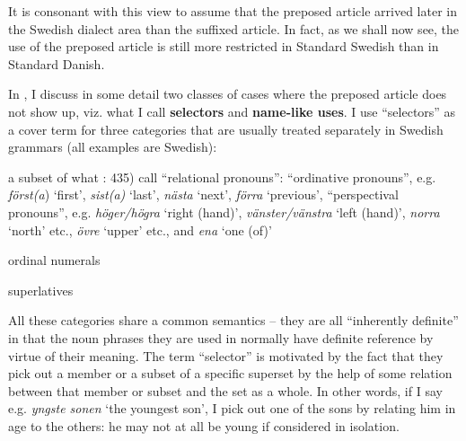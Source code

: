 \begin{styleBodytextC}
It is consonant with this view to assume that the preposed article arrived later in the Swedish dialect area than the suffixed article. In fact, as we shall now see, the use of the preposed article is still more restricted in Standard Swedish than in Standard Danish. 

\end{styleBodytextC}

\begin{styleBodytextC}
In \citet{Dahl2003}, I discuss in some detail two classes of cases where the preposed article does not show up, viz. what I call \textbf{selectors} and \textbf{name-like uses}. I use “selectors” as a cover term for three categories that are usually treated separately in Swedish grammars (all examples are Swedish):

\end{styleBodytextC}


\begin{listWWNumiileveli}
\item 

\begin{styleMyNumberedList}
a subset of what \citet{TelemanEtAl1999}: 435) call “relational pronouns”: “ordinative pronouns”, e.g. \textit{först(a}) ‘first’, \textit{sist(a)} ‘last’, \textit{nästa} ‘next’, \textit{förra }‘previous’, “perspectival pronouns”, e.g. \textit{höger/högra }‘right (hand)’, \textit{vänster/vänstra} ‘left (hand)’, \textit{norra} ‘north’ etc., \textit{övre} ‘upper’ etc., and \textit{ena} ‘one (of)’ 

\end{styleMyNumberedList}

\item 

\begin{styleMyNumberedList}
ordinal numerals

\end{styleMyNumberedList}

\item 

\begin{styleMyNumberedList}
superlatives

\end{styleMyNumberedList}

\end{listWWNumiileveli}

\begin{styleBodyTextFirst}
All these categories share a common semantics – they are all “inherently definite” in that the noun phrases they are used in normally have definite reference by virtue of their meaning. The term “selector” is motivated by the fact that they pick out a member or a subset of a specific superset by the help of some relation between that member or subset and the set as a whole. In other words, if I say e.g. \textit{yngste sonen} ‘the youngest son’, I pick out one of the sons by relating him in age to the others: he may not at all be young if considered in isolation. 

\end{styleBodyTextFirst}

